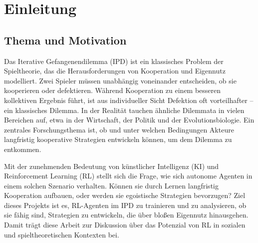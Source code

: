 \chapter{Einleitung}

\section{Thema und Motivation}
Das Iterative Gefangenendilemma (IPD) ist ein klassisches Problem der Spieltheorie, 
das die Herausforderungen von Kooperation und Eigennutz modelliert. 
Zwei Spieler müssen unabhängig voneinander entscheiden, ob sie kooperieren oder 
defektieren. Während Kooperation zu einem besseren kollektiven Ergebnis führt, 
ist aus individueller Sicht Defektion oft vorteilhafter – ein klassisches Dilemma.
In der Realität tauchen ähnliche Dilemmata in vielen Bereichen auf, etwa in der 
Wirtschaft, der Politik und der Evolutionsbiologie. Ein zentrales Forschungsthema 
ist, ob und unter welchen Bedingungen Akteure langfristig kooperative Strategien 
entwickeln können, um dem Dilemma zu entkommen.

Mit der zunehmenden Bedeutung von künstlicher Intelligenz (KI) und Reinforcement 
Learning (RL) stellt sich die Frage, wie sich autonome Agenten in einem solchen 
Szenario verhalten. Können sie durch Lernen langfristig Kooperation aufbauen, 
oder werden sie egoistische Strategien bevorzugen? Ziel dieses Projekts ist es, 
RL-Agenten im IPD zu trainieren und zu analysieren, ob sie fähig sind, Strategien 
zu entwickeln, die über bloßen Eigennutz hinausgehen. Damit trägt diese Arbeit zur 
Diskussion über das Potenzial von RL in sozialen und spieltheoretischen Kontexten 
bei.

